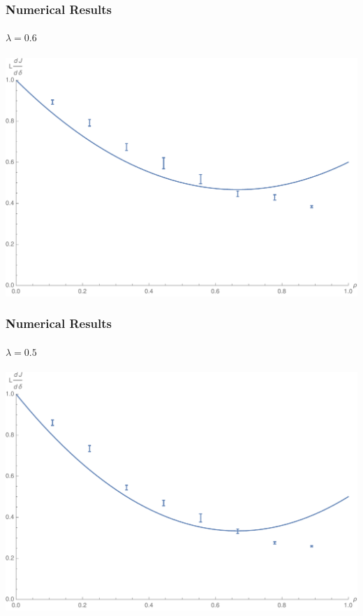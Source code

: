 \documentclass{beamer}
\begin{document}
\begin{frame}
 \frametitle{Numerical Results}
 \framesubtitle{$\lambda = 0.6$}
 \begin{center}
  \includegraphics[width=0.9\linewidth]{images/lambda0p6}
 \end{center}
\end{frame}

\begin{frame}
 \frametitle{Numerical Results}
 \framesubtitle{$\lambda = 0.5$}
 \begin{center}
  \includegraphics[width=0.9\linewidth]{images/lambda0p5}
 \end{center}
\end{frame}
\end{document}
